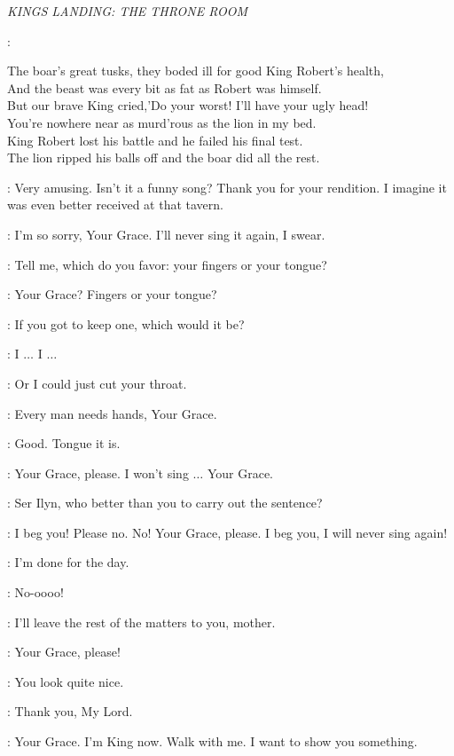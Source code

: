 \textit{KINGS LANDING: THE THRONE ROOM} 

\MARILLION:  

The boar's great tusks, they boded ill for good King Robert's health,\\
And the beast was every bit as fat as Robert was himself.\\
But our brave King cried,'Do your worst! I'll have your ugly head! \\
You're nowhere near as murd'rous as  the lion in my bed. \\
King Robert lost his battle and  he failed his final test.  \\
The lion ripped his balls off and the boar did all the rest.

\JOFFREY: Very amusing. Isn't it a funny song? Thank you for your rendition. I imagine it was even better received at that tavern. 

\MARILLION: I'm so sorry, Your Grace. I'll never sing it again, I swear. 

\JOFFREY: Tell me, which do you favor: your fingers or your tongue? 

\MARILLION: Your Grace? Fingers or your tongue? 

\JOFFREY: If you got to keep one, which would it be? 

\MARILLION: I $\ldots$ I $\ldots$  

\JOFFREY: Or I could just cut your throat. 

\MARILLION: Every man needs hands, Your Grace. 

\JOFFREY: Good. Tongue it is. 

\MARILLION: Your Grace, please. I won't sing $\ldots$ Your Grace. 

\JOFFREY: Ser Ilyn, who better than you to carry out the sentence? 

\MARILLION: I beg you! Please no. No! Your Grace, please. I beg you, I will never sing again! 

\JOFFREY: I'm done for the day. 

\MARILLION: No-oooo! 

\JOFFREY: I'll leave the rest of the matters to you, mother. 

\MARILLION: Your Grace, please! 

\JOFFREY: You look quite nice. 

\SANSA: Thank you, My Lord. 

\JOFFREY: Your Grace. I'm King now. Walk with me. I want to show you something. 

